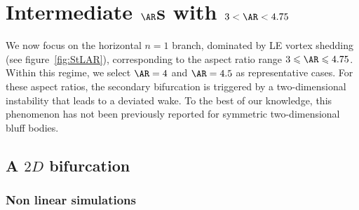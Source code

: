 \section{Intermediate $\AR$s with $3 < \AR < 4.75$}
\label{sec:int}

We now focus on the horizontal $n=1$ branch, dominated by LE vortex shedding (see figure~\ref{fig:StLAR}), corresponding to the aspect ratio range $3 \leq \AR \leq 4.75$. Within this regime, we select $\AR=4$ and $\AR=4.5$ as representative cases. For these aspect ratios, the secondary bifurcation is triggered by a two-dimensional instability that leads to a deviated wake. To the best of our knowledge, this phenomenon has not been previously reported for symmetric two-dimensional bluff bodies.

\subsection{A $2D$ bifurcation}

\subsubsection{Non linear simulations}

